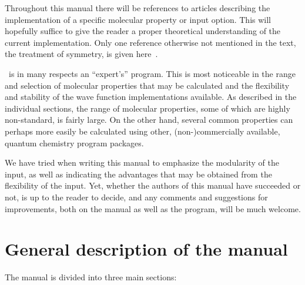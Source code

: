 Throughout this manual there will be references to articles
describing the implementation of a specific molecular property or
input option. This will hopefully suffice to give the reader a proper
theoretical understanding of the current implementation. Only one
reference otherwise not mentioned in the text, the treatment of
symmetry, is given here~\cite{prttca69}.

\dalton\ is in many respects an ``expert's'' program. This is most
noticeable in the range and selection of molecular properties that may
be calculated and the flexibility and stability of the wave function
implementations available. As described in the individual sections, the range of
molecular properties, some of which are highly non-standard, is fairly
large. On the other hand, several common properties can perhaps more
easily be calculated using other, (non-)commercially available, quantum
chemistry program packages.

We have tried when writing this manual to emphasize the modularity of
the input, as well as indicating  the advantages that may be obtained from
the flexibility of the input. Yet, whether the authors of
this manual have succeeded or not, is up to the reader to decide, and
any comments and suggestions for improvements, both on the manual as
well as the program, will be much welcome.

\section{General description of the manual}

The manual is divided into three main sections:

